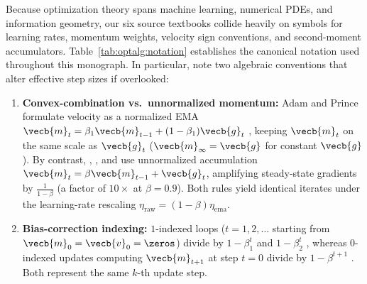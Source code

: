 \documentclass[../../../../master.tex]{subfiles}
\begin{document}
\begin{crossbook}
Because optimization theory spans machine learning, numerical PDEs, and information geometry, our six source textbooks collide heavily on symbols for learning rates, momentum weights, velocity sign conventions, and second-moment accumulators. Table~\ref{tab:optalg:notation} establishes the canonical notation used throughout this monograph. In particular, note two algebraic conventions that alter effective step sizes if overlooked:
\begin{enumerate}
  \item \textbf{Convex-combination vs.\ unnormalized momentum:} Adam and Prince formulate velocity as a normalized EMA $\vecb{m}_t = \beta_1 \vecb{m}_{t-1} + (1 - \beta_1)\vecb{g}_t$ , keeping $\vecb{m}_t$ on the same scale as $\vecb{g}_t$ ($\vecb{m}_\infty = \vecb{g}$ for constant $\vecb{g}$). By contrast, , , and  use unnormalized accumulation $\vecb{m}_t = \beta \vecb{m}_{t-1} + \vecb{g}_t$, amplifying steady-state gradients by $\frac{1}{1-\beta}$ (a factor of $10\times$ at $\beta = 0.9$). Both rules yield identical iterates under the learning-rate rescaling $\eta_{\mathrm{raw}} = (1-\beta)\eta_{\mathrm{ema}}$.
  \item \textbf{Bias-correction indexing:} $1$-indexed loops ($t = 1,2,\dots$ starting from $\vecb{m}_0 = \vecb{v}_0 = \zeros$) divide by $1 - \beta_1^t$ and $1 - \beta_2^t$  , whereas $0$-indexed updates computing $\vecb{m}_{t+1}$ at step $t=0$ divide by $1 - \beta^{t+1}$ . Both represent the same $k$-th update step.
\end{enumerate}
\end{crossbook}
\end{document}
